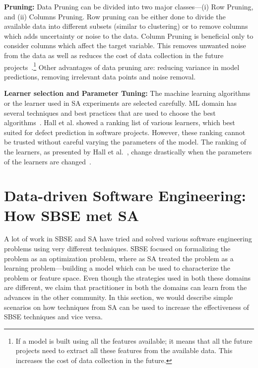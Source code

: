 \documentclass[table, xcdraw, sigconf,review, anonymous]{acmart}
\begin{document}
\noindent\textbf{Pruning: }Data Pruning can be divided into two major classes---(i) Row Pruning, and (ii) Columns Pruning. Row pruning can be either done to divide the available data into different subsets (similar to clustering) or to remove columns which adds uncertainty or noise to the data. Column Pruning is beneficial only to consider columns which affect the target variable. This removes unwanted noise from the data as well as reduces the cost of data collection in the future projects~\cite{kirsopp2003case, hall2003benchmarking, chen2005finding, gao2011choosing}.\footnote{If a model is built using all the features available; it means that all the future projects need to extract all these features from the available data. This increases the cost of data collection in the future. } Other advantages of data pruning are: reducing variance in model predictions, removing irrelevant data points and noise removal.

\noindent\textbf{Learner selection and Parameter Tuning: } The machine learning algorithms or the learner used in SA experiments are selected carefully. ML domain has several techniques and best practices that are used to choose the best algorithms~\cite{witten2016data, malkomes2016bayesian}. Hall et al. showed a ranking list of various learners, which best suited for defect prediction in software projects. However, these ranking cannot be trusted without careful varying the parameters of the model. The ranking of the learners, as presented by Hall et al.~\cite{hall2012systematic}, change drastically when the parameters of the learners are changed~\cite{fu2016tuning, tantithamthavorn2016automated, fu2017easy}. 

\section{Data-driven Software Engineering: How SBSE met SA}
A lot of work in SBSE and SA have tried and solved various software engineering problems using very different techniques. SBSE focused on formalizing the problem as an optimization problem, where as SA treated the problem as a learning problem---building a model which can be used to characterize the problem or feature space. Even though the strategies used in both these domains are different, we claim that practitioner in both the domains can learn from the advances in the other community. In this section, we would describe simple scenarios on how techniques from SA can be used to increase the effectiveness of SBSE techniques and vice versa. 
\end{document}
